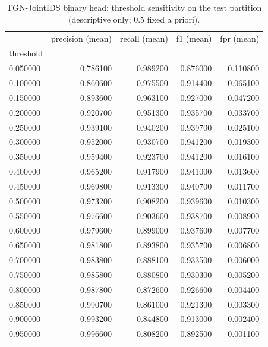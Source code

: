 \begin{table}
\caption{TGN-JointIDS binary head: threshold sensitivity on the test partition (descriptive only; 0.5 fixed a priori).}
\label{tab:table9_threshold_sensitivity}
\begin{tabular}{lrrrr}
\toprule
 & precision (mean) & recall (mean) & f1 (mean) & fpr (mean) \\
threshold &  &  &  &  \\
\midrule
0.050000 & 0.786100 & 0.989200 & 0.876000 & 0.110800 \\
0.100000 & 0.860600 & 0.975500 & 0.914400 & 0.065100 \\
0.150000 & 0.893600 & 0.963100 & 0.927000 & 0.047200 \\
0.200000 & 0.920700 & 0.951300 & 0.935700 & 0.033700 \\
0.250000 & 0.939100 & 0.940200 & 0.939700 & 0.025100 \\
0.300000 & 0.952000 & 0.930700 & 0.941200 & 0.019300 \\
0.350000 & 0.959400 & 0.923700 & 0.941200 & 0.016100 \\
0.400000 & 0.965200 & 0.917900 & 0.941000 & 0.013600 \\
0.450000 & 0.969800 & 0.913300 & 0.940700 & 0.011700 \\
0.500000 & 0.973200 & 0.908200 & 0.939600 & 0.010300 \\
0.550000 & 0.976600 & 0.903600 & 0.938700 & 0.008900 \\
0.600000 & 0.979600 & 0.899000 & 0.937600 & 0.007700 \\
0.650000 & 0.981800 & 0.893800 & 0.935700 & 0.006800 \\
0.700000 & 0.983800 & 0.888100 & 0.933500 & 0.006000 \\
0.750000 & 0.985800 & 0.880800 & 0.930300 & 0.005200 \\
0.800000 & 0.987800 & 0.872600 & 0.926600 & 0.004400 \\
0.850000 & 0.990700 & 0.861000 & 0.921300 & 0.003300 \\
0.900000 & 0.993200 & 0.844800 & 0.913000 & 0.002400 \\
0.950000 & 0.996600 & 0.808200 & 0.892500 & 0.001100 \\
\bottomrule
\end{tabular}
\end{table}
